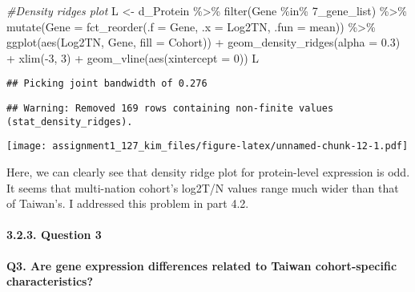 \documentclass[
]{article}
\newenvironment{Shaded}{\begin{snugshade}}{\end{snugshade}}
\newcommand{\AttributeTok}[1]{\textcolor[rgb]{0.77,0.63,0.00}{#1}}
\newcommand{\CommentTok}[1]{\textcolor[rgb]{0.56,0.35,0.01}{\textit{#1}}}
\newcommand{\DecValTok}[1]{\textcolor[rgb]{0.00,0.00,0.81}{#1}}
\newcommand{\FloatTok}[1]{\textcolor[rgb]{0.00,0.00,0.81}{#1}}
\newcommand{\FunctionTok}[1]{\textcolor[rgb]{0.00,0.00,0.00}{#1}}
\newcommand{\NormalTok}[1]{#1}
\newcommand{\OtherTok}[1]{\textcolor[rgb]{0.56,0.35,0.01}{#1}}
\newcommand{\SpecialCharTok}[1]{\textcolor[rgb]{0.00,0.00,0.00}{#1}}
\newcommand{\StringTok}[1]{\textcolor[rgb]{0.31,0.60,0.02}{#1}}
\begin{document}
\begin{Shaded}
\begin{Highlighting}[]
\CommentTok{\#Density ridges plot}
\NormalTok{L }\OtherTok{\textless{}{-}}\NormalTok{ d\_Protein }\SpecialCharTok{\%\textgreater{}\%} 
  \FunctionTok{filter}\NormalTok{(Gene }\SpecialCharTok{\%in\%} \StringTok{\textasciigrave{}}\AttributeTok{7\_gene\_list}\StringTok{\textasciigrave{}}\NormalTok{) }\SpecialCharTok{\%\textgreater{}\%}
  \FunctionTok{mutate}\NormalTok{(}\AttributeTok{Gene =} \FunctionTok{fct\_reorder}\NormalTok{(}\AttributeTok{.f =}\NormalTok{ Gene, }\AttributeTok{.x =}\NormalTok{ Log2TN, }\AttributeTok{.fun =}\NormalTok{ mean)) }\SpecialCharTok{\%\textgreater{}\%}
  \FunctionTok{ggplot}\NormalTok{(}\FunctionTok{aes}\NormalTok{(Log2TN, Gene, }\AttributeTok{fill =}\NormalTok{ Cohort)) }\SpecialCharTok{+}  
  \FunctionTok{geom\_density\_ridges}\NormalTok{(}\AttributeTok{alpha =} \FloatTok{0.3}\NormalTok{) }\SpecialCharTok{+}
  \FunctionTok{xlim}\NormalTok{(}\SpecialCharTok{{-}}\DecValTok{3}\NormalTok{, }\DecValTok{3}\NormalTok{) }\SpecialCharTok{+}
  \FunctionTok{geom\_vline}\NormalTok{(}\FunctionTok{aes}\NormalTok{(}\AttributeTok{xintercept =} \DecValTok{0}\NormalTok{))}
\NormalTok{L}
\end{Highlighting}
\end{Shaded}

\begin{verbatim}
## Picking joint bandwidth of 0.276
\end{verbatim}

\begin{verbatim}
## Warning: Removed 169 rows containing non-finite values (stat_density_ridges).
\end{verbatim}

\texttt{[image: assignment1\_127\_kim\_files/figure-latex/unnamed-chunk-12-1.pdf]}

Here, we can clearly see that density ridge plot for protein-level
expression is odd. It seems that multi-nation cohort's log2T/N values
range much wider than that of Taiwan's. I addressed this problem in part
4.2.

\hypertarget{question-3}{%
\paragraph{3.2.3. Question 3}\label{question-3}}

\textbf{Q3. Are gene expression differences related to Taiwan
cohort-specific characteristics?}
\end{document}
